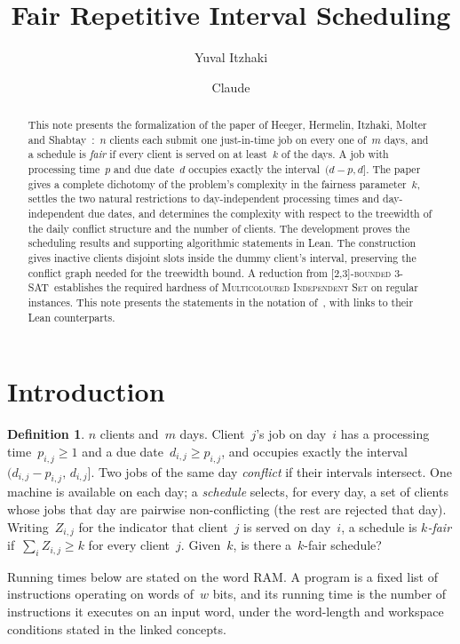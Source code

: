 \documentclass[11pt,a4paper]{article}
\title{Fair Repetitive Interval Scheduling}
\author{Yuval Itzhaki \and Claude}
\date{}
\theoremstyle{definition}
\newtheorem{definition}{Definition}
\newcommand{\SAT}{[2,3]-\textsc{bounded 3-SAT}}
\begin{document}
\maketitle

\begin{abstract}
This note presents the formalization of the paper of Heeger, Hermelin, Itzhaki, Molter and
Shabtay~\cite{HHIMS}:~$n$ clients each submit one just-in-time job on every one of~$m$
days, and a schedule is \emph{fair} if every client is served on at least~$k$ of the days.
A job with processing time~$p$ and due date~$d$ occupies exactly the interval~$(d-p,d]$.
The paper gives a complete dichotomy of the problem's complexity in the fairness parameter~$k$, settles the two natural restrictions to day-independent processing times and
day-independent due dates, and determines the complexity with respect to the treewidth of
the daily conflict structure and the number of clients. The development proves the scheduling results and supporting algorithmic statements in Lean. The construction gives inactive clients disjoint slots
inside the dummy client's interval, preserving the conflict graph needed for the
treewidth bound. A reduction from \SAT\ establishes the required hardness of
\textsc{Multicoloured Independent Set} on regular instances. This note presents the
statements in the notation of~\cite{HHIMS}, with links to their Lean counterparts.
\end{abstract}

\section{Introduction}

\begin{definition}
\label{def:equijit}
$n$ clients and~$m$ days. Client~$j$'s job on day~$i$ has a processing time~$p_{i,j}\ge1$ and a due date~$d_{i,j}\ge p_{i,j}$, and occupies exactly the interval~$(d_{i,j}-p_{i,j},\,d_{i,j}]$. Two jobs of the same day \emph{conflict} if their intervals
intersect. One machine is available on each day; a \emph{schedule} selects, for every day,
a set of clients whose jobs that day are pairwise non-conflicting (the rest are rejected
that day). Writing~$Z_{i,j}$ for the indicator that client~$j$ is served on day~$i$, a
schedule is \emph{$k$-fair} if~$\sum_iZ_{i,j}\ge k$ for every client~$j$. Given~$k$, is
there a~$k$-fair schedule?
\end{definition}

Running times below are stated on the word RAM. A program is a fixed list of instructions
operating on words of~$w$ bits, and its running time is the number of instructions it
executes on an input word, under the word-length and workspace conditions stated in the linked concepts.
\end{document}
